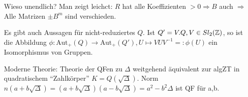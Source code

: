 \documentclass[a4paper,DIV15,BCOR12mm]{article}
\begin{document}
Wieso unendlich? Man zeigt leichct: $R$ hat alle Koeffizienten $> 0 \Rightarrow B$ auch $\Rightarrow$ Alle Matrizen $\pm B^m$ sind verschieden.

Es gibt auch Aussagen für nicht-reduziertes $Q$. Ist $Q' = V.Q, V \in Sl_2(\mathbb{Z})$, so ist die Abbildung $\phi: \text{Aut}_+(Q) \to \text{Aut}_+(Q'), U \mapsto VUV^{-1} =: \phi(U)$ ein Isomorphismus von Gruppen.

Moderne Theorie: Theorie der QFen zu $\Delta$ weitgehend äquivalent zur algZT in quadratischem "`Zahlkörper"' $K = Q(\sqrt{\Delta})$. Norm $n(a + b\sqrt{\Delta}) = (a + b\sqrt{\Delta})(a-b\sqrt{\Delta}) = a^2 - b^2 \Delta$ ist QF für a,b.
\end{document}
